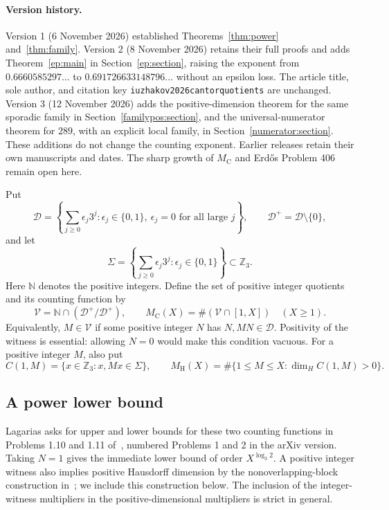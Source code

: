 \documentclass[11pt]{article}
\theoremstyle{remark}
\newcommand{\D}{\mathcal D}
\newcommand{\Z}{\mathbb Z}
\newcommand{\N}{\mathbb N}
\newcommand{\MC}{M_{\mathrm C}}
\newcommand{\MH}{M_{\mathrm H}}
\begin{document}
\paragraph{Version history.}
Version 1 (6 November 2026) established Theorems~\ref{thm:power}
and~\ref{thm:family}. Version 2 (8 November 2026) retains their full
proofs and adds Theorem~\ref{ep:main} in Section~\ref{ep:section},
raising the exponent from $0.6660585297\ldots$ to
$0.691726633148796\ldots$ without an epsilon loss.
The article title, sole author, and citation key
\texttt{iuzhakov2026cantorquotients} are unchanged.
Version 3 (12 November 2026) adds the positive-dimension theorem for the
same sporadic family in Section~\ref{familypos:section}, and the
universal-numerator theorem for $289$, with an explicit local family,
in Section~\ref{numerator:section}. These additions do not change the
counting exponent. Earlier releases retain their own manuscripts and dates.
The sharp growth of $\MC$ and Erd\H{o}s Problem 406 remain open here.


Put
\[
 \D=\left\{\sum_{j\ge0}\epsilon_j3^j:
   \epsilon_j\in\{0,1\},\ \epsilon_j=0\text{ for all large }j\right\},
 \qquad \D^+=\D\setminus\{0\},
\]
and let
\[
 \Sigma=\left\{\sum_{j\ge0}\epsilon_j3^j:
                    \epsilon_j\in\{0,1\}\right\}\subset\Z_3.
\]
Here $\N$ denotes the positive integers. Define the set of positive
integer quotients and its counting function by
\[
 \mathcal V=\N\cap(\D^+/\D^+),\qquad
 \MC(X)=\#(\mathcal V\cap[1,X])\quad(X\ge1).
\]
Equivalently, $M\in\mathcal V$ if some positive integer $N$ has
$N,MN\in\D$. Positivity of the witness is essential: allowing $N=0$
would make this condition vacuous. For a positive integer $M$, also put
\[
 C(1,M)=\{x\in\Z_3:x,Mx\in\Sigma\},\qquad
 \MH(X)=\#\{1\le M\le X:\dim_H C(1,M)>0\}.
\]

\subsection{A power lower bound}

Lagarias asks for upper and lower bounds for these two counting
functions in Problems 1.10 and 1.11 of~\cite{Lagarias}, numbered
Problems 1 and 2 in the arXiv version. Taking $N=1$ gives the immediate
lower bound of order $X^{\log_3 2}$. A positive integer witness also
implies positive Hausdorff dimension by the nonoverlapping-block
construction in~\cite{Lagarias}; we include this construction below.
The inclusion of the integer-witness multipliers in the
positive-dimensional multipliers is strict in general.
\end{document}
